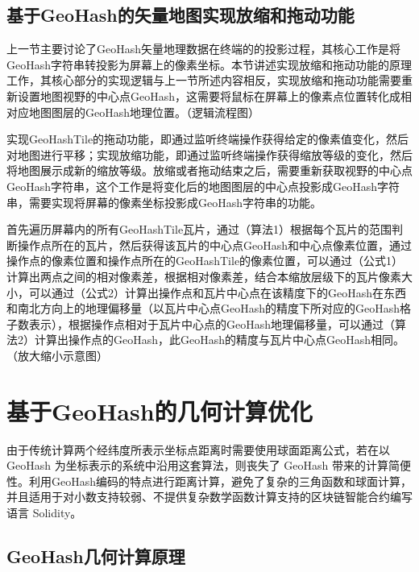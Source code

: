 
\subsection{基于GeoHash的矢量地图实现放缩和拖动功能}

上一节主要讨论了GeoHash矢量地理数据在终端的的投影过程，其核心工作是将GeoHash字符串转投影为屏幕上的像素坐标。本节讲述实现放缩和拖动功能的原理工作，其核心部分的实现逻辑与上一节所述内容相反，实现放缩和拖动功能需要重新设置地图视野的中心点GeoHash，这需要将鼠标在屏幕上的像素点位置转化成相对应地图图层的GeoHash地理位置。（逻辑流程图）

实现GeoHashTile的拖动功能，即通过监听终端操作获得给定的像素值变化，然后对地图进行平移；实现放缩功能，即通过监听终端操作获得缩放等级的变化，然后将地图展示成新的缩放等级。放缩或者拖动结束之后，需要重新获取视野的中心点GeoHash字符串，这个工作是将变化后的地图图层的中心点投影成GeoHash字符串，需要实现将屏幕的像素坐标投影成GeoHash字符串的功能。

首先遍历屏幕内的所有GeoHashTile瓦片，通过（算法1）根据每个瓦片的范围判断操作点所在的瓦片，然后获得该瓦片的中心点GeoHash和中心点像素位置，通过操作点的像素位置和操作点所在的GeoHashTile的像素位置，可以通过（公式1）计算出两点之间的相对像素差，根据相对像素差，结合本缩放层级下的瓦片像素大小，可以通过（公式2）计算出操作点和瓦片中心点在该精度下的GeoHash在东西和南北方向上的地理偏移量（以瓦片中心点GeoHash的精度下所对应的GeoHash格子数表示），根据操作点相对于瓦片中心点的GeoHash地理偏移量，可以通过（算法2）计算出操作点的GeoHash，此GeoHash的精度与瓦片中心点GeoHash相同。（放大缩小示意图）


\section{基于GeoHash的几何计算优化}
由于传统计算两个经纬度所表示坐标点距离时需要使用球面距离公式，若在以 GeoHash 为坐标表示的系统中沿用这套算法，则丧失了 GeoHash 带来的计算简便性。利用GeoHash编码的特点进行距离计算，避免了复杂的三角函数和球面计算，并且适用于对小数支持较弱、不提供复杂数学函数计算支持的区块链智能合约编写语言 Solidity。

\subsection{GeoHash几何计算原理}

